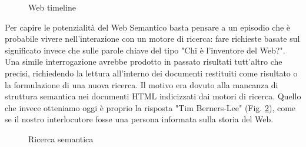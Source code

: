 \begin{figure}[htb]
	\caption{Web timeline}
	\label{fig:introduction:web_timeline}
\end{figure}


Per capire le potenzialità del Web Semantico basta pensare a un episodio che è probabile vivere nell'interazione con un motore di ricerca: fare richieste basate sul significato invece che sulle parole chiave del tipo "Chi è l'inventore del Web?". Una simile interrogazione avrebbe prodotto in passato risultati tutt'altro che precisi, richiedendo la lettura all'interno dei documenti restituiti come risultato o la formulazione di una nuova ricerca. Il motivo era dovuto alla mancanza di struttura semantica nei documenti HTML indicizzati dai motori di ricerca.
Quello che invece otteniamo oggi è proprio la risposta "Tim Berners-Lee" (Fig. \ref{fig:introduction:ricerca_semantica}), come se il nostro interlocutore fosse una persona informata sulla storia del Web.

\begin{figure}[htb]
	\caption{Ricerca semantica}
	\label{fig:introduction:ricerca_semantica}
\end{figure}

